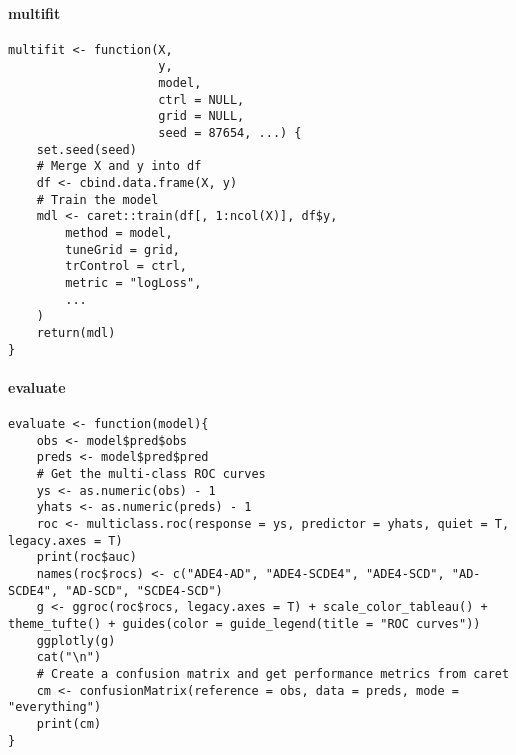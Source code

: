 \paragraph{multifit} \label{app:multifit}
\begin{verbatim}
multifit <- function(X,
                     y,
                     model,
                     ctrl = NULL,
                     grid = NULL,
                     seed = 87654, ...) {
    set.seed(seed)
    # Merge X and y into df
    df <- cbind.data.frame(X, y)
    # Train the model
    mdl <- caret::train(df[, 1:ncol(X)], df$y,
        method = model,
        tuneGrid = grid,
        trControl = ctrl,
        metric = "logLoss",
        ...
    )
    return(mdl)
}
\end{verbatim}

\paragraph{evaluate} \label{app:evaluate}

\begin{verbatim}
evaluate <- function(model){
    obs <- model$pred$obs
    preds <- model$pred$pred
    # Get the multi-class ROC curves
    ys <- as.numeric(obs) - 1
    yhats <- as.numeric(preds) - 1
    roc <- multiclass.roc(response = ys, predictor = yhats, quiet = T, legacy.axes = T)
    print(roc$auc)
    names(roc$rocs) <- c("ADE4-AD", "ADE4-SCDE4", "ADE4-SCD", "AD-SCDE4", "AD-SCD", "SCDE4-SCD")
    g <- ggroc(roc$rocs, legacy.axes = T) + scale_color_tableau() + theme_tufte() + guides(color = guide_legend(title = "ROC curves"))
    ggplotly(g)
    cat("\n")
    # Create a confusion matrix and get performance metrics from caret
    cm <- confusionMatrix(reference = obs, data = preds, mode = "everything")
    print(cm)
}    
\end{verbatim}
